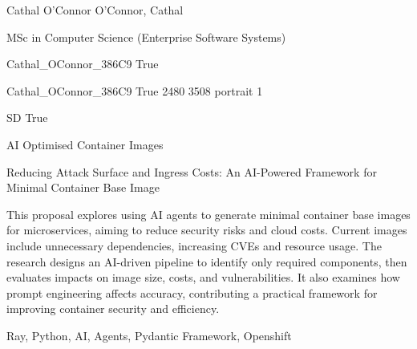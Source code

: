 \documentclass[twoside]{report}
\begin{document}
\begingroup{}\relax



\def\Key{Cathal_OConnor_386C9}

{Cathal O'Connor}
{O'Connor, Cathal}

{MSc in Computer Science (Enterprise Software Systems)}

{Cathal_OConnor_386C9}
{True}

{Cathal_OConnor_386C9}
{True}
{2480}
{3508}
{portrait}
{1}

{SD}
{True}

{AI Optimised Container Images}

{Reducing Attack Surface and Ingress Costs: An AI-Powered Framework for Minimal Container Base Image}

{This proposal explores using AI agents to generate minimal container base images for microservices, aiming to reduce security risks and cloud costs. Current images include unnecessary dependencies, increasing CVEs and resource usage. The research designs an AI-driven pipeline to identify only required components, then evaluates impacts on image size, costs, and vulnerabilities. It also examines how prompt engineering affects accuracy, contributing a practical framework for improving container security and efficiency.}

{Ray, Python, AI, Agents, Pydantic Framework, Openshift}
\end{document}
